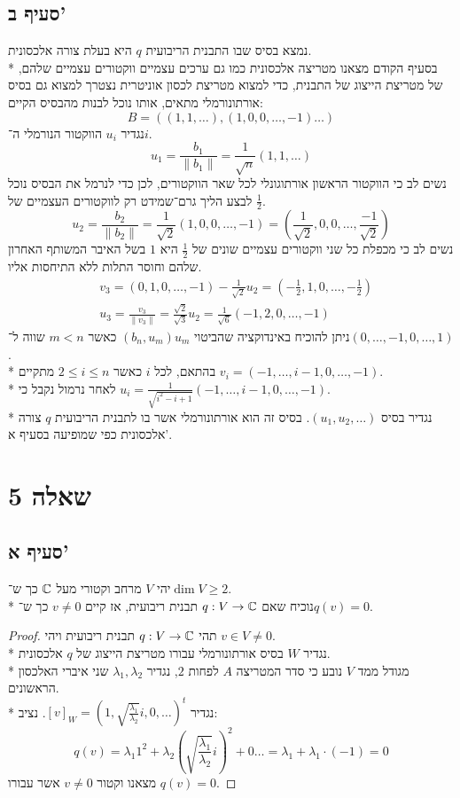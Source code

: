 \subsection{סעיף ב'}
נמצא בסיס שבו התבנית הריבועית $q$ היא בעלת צורה אלכסונית. \\*
בסעיף הקודם מצאנו מטריצה אלכסונית כמו גם ערכים עצמיים ווקטורים עצמיים שלהם, של מטריצת הייצוג של התבנית,
כדי למצוא מטריצת לכסון אוניטרית נצטרך למצוא גם בסיס אורתונורמלי מתאים, אותו נוכל לבנות מהבסיס הקיים:
\[
	B = \left( (1, 1, \hdots), (1, 0, 0, \hdots, -1) \hdots \right)
\]
נגדיר $u_i$ הווקטור הנורמלי ה־$i$.
\[
	u_1 = \frac{b_1}{\lVert b_1 \rVert} = \frac{1}{\sqrt{n}} (1, 1, \hdots)
\]
נשים לב כי הווקטור הראשון אורתוגונלי לכל שאר הווקטורים, לכן כדי לנרמל את הבסיס נוכל לבצע הליך גרם־שמידט רק לווקטורים העצמיים של $\frac{1}{2}$.
\[
	u_2 = \frac{b_2}{\lVert b_2 \rVert} = \frac{1}{\sqrt{2}} \left(1, 0, 0, \hdots, -1\right)
	= \left(\frac{1}{\sqrt{2}}, 0, 0, \hdots, \frac{-1}{\sqrt{2}}\right)
\]
נשים לב כי מכפלת כל שני ווקטורים עצמיים שונים של $\frac{1}{2}$ היא $1$ בשל האיבר המשותף האחרון שלהם וחוסר התלות ללא התיחסות אליו.
\begin{align*}
	& v_3 = (0, 1, 0, \hdots, -1) - \frac{1}{\sqrt{2}} u_2 = (-\frac{1}{2}, 1, 0, \hdots, -\frac{1}{2}) \\
	& u_3 = \frac{v_3}{\lVert v_3 \rVert} = \frac{\sqrt{2}}{\sqrt{3}} u_2 = \frac{1}{\sqrt{6}} (-1, 2, 0, \hdots, -1)
\end{align*}
ניתן להוכיח באינדוקציה שהביטוי $(b_n, u_m) u_m$ כאשר $m < n$ שווה ל־$(0, \hdots, -1, 0, \hdots, 1)$. \\*
בהתאם, לכל $i$ כאשר $2 \le i \le n$ מתקיים $v_i = (-1, \hdots, i - 1, 0, \hdots, -1)$. \\*
לאחר נרמול נקבל כי $u_i = \frac{1}{\sqrt{i^2 - i + 1}} (-1, \hdots, i - 1, 0, \hdots, -1)$. \\*
נגדיר בסיס $(u_1, u_2, \hdots)$. בסיס זה הוא אורתונורמלי אשר בו לתבנית הריבועית $q$ צורה אלכסונית כפי שמופיעה בסעיף א'.

\section{שאלה 5}
\subsection{סעיף א'}
יהי $V$ מרחב וקטורי מעל $\mathbb{C}$ כך ש־$\dim V \ge 2$. \\*
נוכיח שאם $q: V \to \mathbb{C}$ תבנית ריבועית, אז קיים $v \ne 0$ כך ש־$q(v) = 0$.
\begin{proof}
	תהי $q : V \to \mathbb{C}$ תבנית ריבועית ויהי $v \in V \ne 0$. \\*
	נגדיר $W$ בסיס אורתונורמלי עבורו מטריצת הייצוג של $q$ אלכסונית. \\*
	מגודל ממד $V$ נובע כי סדר המטריצה $A$ לפחות $2$, נגדיר $\lambda_1, \lambda_2$ שני איברי האלכסון הראשונים. \\*
	נגדיר $[v]_W = (1, \sqrt{\frac{\lambda_1}{\lambda_2}}i, 0, \hdots)^t$.
	נציב:
	\[
		q(v) = \lambda_1 1^2 + \lambda_2 \left( \sqrt{\frac{\lambda_1}{\lambda_2}} i\right)^2 + 0 \hdots
		= \lambda_1 + \lambda_1 \cdot (-1)
		= 0
	\]
	מצאנו וקטור $v \ne 0$ אשר עבורו $q(v) = 0$.
\end{proof}


